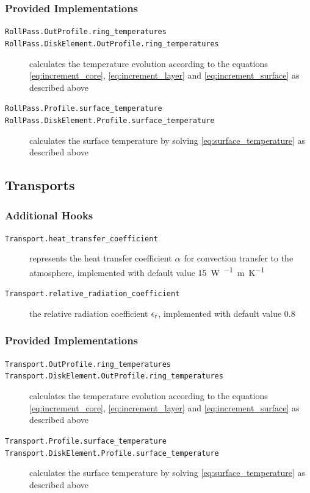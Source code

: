 \documentclass{scrartcl}
\begin{document}
    \subsubsection{Provided Implementations}

    \begin{description}
        \item[\texttt{RollPass.OutProfile.ring\_temperatures}]
        \item[\texttt{RollPass.DiskElement.OutProfile.ring\_temperatures}] calculates the temperature evolution according to the equations \autoref{eq:increment_core}, \autoref{eq:increment_layer} and \autoref{eq:increment_surface} as described above
        \item[\texttt{RollPass.Profile.surface\_temperature}]
        \item[\texttt{RollPass.DiskElement.Profile.surface\_temperature}] calculates the surface temperature by solving \autoref{eq:surface_temperature} as described above
    \end{description}

    \subsection{Transports}

    \subsubsection{Additional Hooks}

    \begin{description}
        \item[\texttt{Transport.heat\_transfer\_coefficient}] represents the heat transfer coefficient ${\alpha}$ for convection transfer to the atmosphere, implemented with default value \qty{15}{\watt\per\squared\meter\per\kelvin}
        \item[\texttt{Transport.relative\_radiation\_coefficient}] the relative radiation coefficient ${\epsilon_\mathrm{r}}$, implemented with default value \num{0.8}
    \end{description}

    \subsubsection{Provided Implementations}

    \begin{description}
        \item[\texttt{Transport.OutProfile.ring\_temperatures}]
        \item[\texttt{Transport.DiskElement.OutProfile.ring\_temperatures}] calculates the temperature evolution according to the equations \autoref{eq:increment_core}, \autoref{eq:increment_layer} and \autoref{eq:increment_surface} as described above
        \item[\texttt{Transport.Profile.surface\_temperature}]
        \item[\texttt{Transport.DiskElement.Profile.surface\_temperature}] calculates the surface temperature by solving \autoref{eq:surface_temperature} as described above
    \end{description}

    

    \printbibliography
\end{document}
